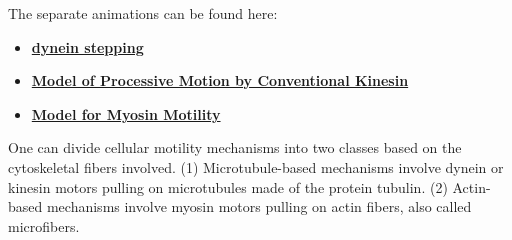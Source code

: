 \documentclass{../lab}
\begin{document}
The separate animations can be found here:

\begin{itemize}
    \item \href{http://experimentationlab.berkeley.edu/sites/default/files/dyneinstepping.mp4}{\textbf{dynein stepping}}
    
    \item \href{http://experimentationlab.berkeley.edu/sites/default/files/motionbykinesin.mp4}{\textbf{Model of Processive Motion by Conventional Kinesin}}
    
    \item \href{http://experimentationlab.berkeley.edu/sites/default/files/myosinmotility.mp4}{\textbf{Model for Myosin Motility}}

\end{itemize}

One can divide cellular motility mechanisms into two classes based on the cytoskeletal fibers involved. (1) Microtubule-based mechanisms involve dynein or kinesin motors pulling on microtubules made of the protein tubulin. (2) Actin-based mechanisms involve myosin motors pulling on actin fibers, also called microfibers.
\end{document}
